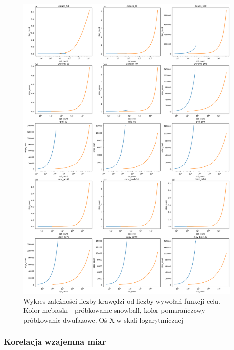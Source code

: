 \begin{figure}[h!]
    \centering
    \includegraphics[width=\textwidth]{chapters/experiments/img/opt_edges.png}
    \caption{Wykres zależności liczby krawędzi od liczby wywołań funkcji celu.
        Kolor niebieski - próbkowanie snowball, kolor pomarańczowy - próbkowanie dwufazowe.
        Oś X w skali logarytmicznej}
    \label{fig:main_opt_nodes}
\end{figure}


\subsubsection{Korelacja wzajemna miar}

